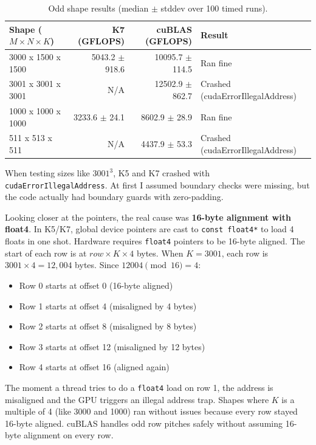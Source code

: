 \documentclass[11pt]{article}
\begin{document}
\begin{table}[h]
\centering
\begin{tabular}{|l|r|r|l|}
\hline
\textbf{Shape ($M \times N \times K$)} & \textbf{K7 (GFLOPS)} & \textbf{cuBLAS (GFLOPS)} & \textbf{Result} \\
\hline
3000 x 1500 x 1500 & 5043.2 $\pm$ 918.6 & 10095.7 $\pm$ 114.5 & Ran fine \\
3001 x 3001 x 3001 & N/A & 12502.9 $\pm$ 862.7 & Crashed (cudaErrorIllegalAddress) \\
1000 x 1000 x 1000 & 3233.6 $\pm$ 24.1 & 8602.9 $\pm$ 28.9 & Ran fine \\
511 x 513 x 511 & N/A & 4437.9 $\pm$ 53.3 & Crashed (cudaErrorIllegalAddress) \\
\hline
\end{tabular}
\caption{Odd shape results (median $\pm$ stddev over 100 timed runs).}
\end{table}

When testing sizes like $3001^3$, K5 and K7 crashed with \texttt{cudaErrorIllegalAddress}. At first I assumed boundary checks were missing, but the code actually had boundary guards with zero-padding.

Looking closer at the pointers, the real cause was \textbf{16-byte alignment with float4}. In K5/K7, global device pointers are cast to \texttt{const float4*} to load 4 floats in one shot. Hardware requires \texttt{float4} pointers to be 16-byte aligned. The start of each row is at $row \times K \times 4$ bytes. When $K=3001$, each row is $3001 \times 4 = 12,004$ bytes. Since $12004 \pmod{16} = 4$:
\begin{itemize}
    \item Row 0 starts at offset 0 (16-byte aligned)
    \item Row 1 starts at offset 4 (misaligned by 4 bytes)
    \item Row 2 starts at offset 8 (misaligned by 8 bytes)
    \item Row 3 starts at offset 12 (misaligned by 12 bytes)
    \item Row 4 starts at offset 16 (aligned again)
\end{itemize}
The moment a thread tries to do a \texttt{float4} load on row 1, the address is misaligned and the GPU triggers an illegal address trap. Shapes where $K$ is a multiple of 4 (like 3000 and 1000) ran without issues because every row stayed 16-byte aligned. cuBLAS handles odd row pitches safely without assuming 16-byte alignment on every row.
\end{document}
